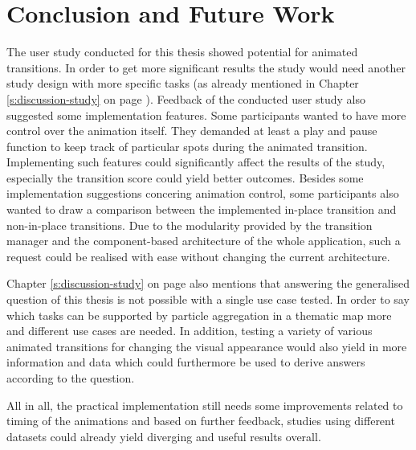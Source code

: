 \section{Conclusion and Future Work}
\label{s:outlook}
\cbstart
The user study conducted for this thesis showed potential for animated transitions. In order to get more significant results the study would need another study design with more specific tasks (as already mentioned in Chapter \ref{s:discussion-study} on page \pageref{s:discussion-study}). Feedback of the conducted user study also suggested some implementation features. Some participants wanted to have more control over the animation itself. They demanded at least a play and pause function to keep track of particular spots during the animated transition. Implementing such features could significantly affect the results of the study, especially the transition score could yield better outcomes. Besides some implementation suggestions concering animation control, some participants also wanted to draw a comparison between the implemented in-place transition and non-in-place transitions. Due to the modularity provided by the transition manager and the component-based architecture of the whole application, such a request could be realised with ease without changing the current architecture.

Chapter \ref{s:discussion-study} on page \pageref{s:discussion-study} also mentions that answering the generalised question of this thesis is not possible with a single use case tested. In order to say which tasks can be supported by particle aggregation in a thematic map more and different use cases are needed. In addition, testing a variety of various animated transitions for changing the visual appearance would also yield in more information and data which could furthermore be used to derive answers according to the question.

All in all, the practical implementation still needs some improvements related to timing of the animations and based on further feedback, studies using different datasets could already yield diverging and useful results overall.
\cbend

